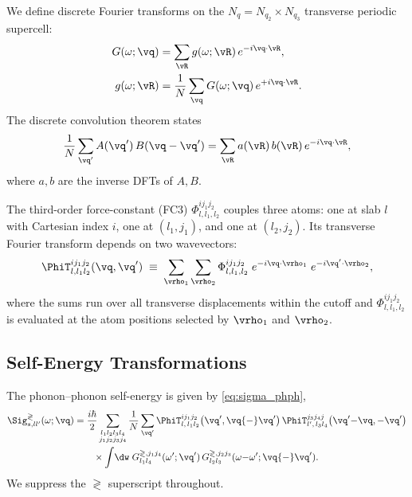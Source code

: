 We define discrete Fourier transforms on the
$N_q = N_{q_2}\times N_{q_3}$ transverse periodic supercell:
\begin{align}
  G(\omega;\vq) &= \sum_{\vR} g(\omega;\vR)\,e^{-i\vq\cdot\vR},
  \label{eq:dft_fwd}\\
  g(\omega;\vR) &= \frac{1}{N}\sum_{\vq} G(\omega;\vq)\,
                    e^{+i\vq\cdot\vR}.
  \label{eq:dft_inv}
\end{align}
The discrete convolution theorem states
\begin{equation}
  \frac{1}{N}\sum_{\vq'} A(\vq')\,B(\vq-\vq')
  = \sum_{\vR} a(\vR)\,b(\vR)\,e^{-i\vq\cdot\vR},
  \label{eq:conv_theorem}
\end{equation}
where $a, b$ are the inverse DFTs of $A, B$.

The third-order force-constant (FC3)
$\Phi^{ij_1j_2}_{l,l_1,l_2}$ couples three atoms: one at slab $l$
with Cartesian index $i$, one at $(l_1, j_1)$, and one at
$(l_2, j_2)$.  Its transverse Fourier transform depends on two
wavevectors:
\begin{equation}
  \PhiT^{ij_1j_2}_{l,l_{1}l_{2}}(\vq,\vq')
  \;\equiv\;
  \sum_{\vrho_1}\sum_{\vrho_2}
  \Phi^{ij_1j_2}_{l,l_1,l_2}\;
  e^{-i\vq\cdot\vrho_1}\;e^{-i\vq'\cdot\vrho_2},
  \label{eq:fc3_fourier}
\end{equation}
where the sums run over all transverse displacements within the
cutoff and $\Phi^{ij_1j_2}_{l,l_1,l_2}$ is evaluated at the atom
positions selected by $\vrho_1$ and $\vrho_2$.


\subsection{Self-Energy Transformations}
\label{sub:preliminary}

The phonon--phonon self-energy is given by \cref{eq:sigma_phph},
\begin{align}
  \Sig^{\gtrless}_{s,ll'}(\omega;\vq)
  &= \frac{i\hbar}{2}
    \sum_{\substack{l_1 l_2 l_3 l_4\\j_1 j_2 j_3 j_4}}
    \frac{1}{N}\sum_{\vq'}
    \PhiT^{ij_1 j_2}_{l,\,l_1 l_2}\!\left(\vq',\vq{-}\vq'\right)
    \PhiT^{j_3 j_4 j}_{l',\,l_3 l_4}\!\left(\vq'{-}\vq,-\vq'\right)
    \notag\\
  &\qquad\times
    \int\!\dw\;
    G^{\gtrless,j_1j_4}_{l_1 l_4}(\omega';\vq')\,
    G^{\gtrless,j_2j_3}_{l_2 l_3}(\omega{-}\omega';\vq{-}\vq').
\end{align}
We suppress the $\gtrless$ superscript throughout.


